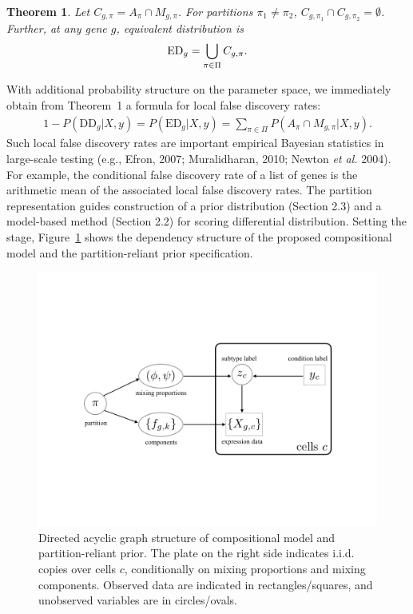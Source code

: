 \documentclass[aoas,preprint]{imsart}
\newtheorem{theorem}{Theorem}
\begin{document}
\begin{theorem}  Let $C_{g,\pi} = A_\pi\cap M_{g, \pi}$.  For 
partitions $\pi_1 \neq\pi_2$, \mbox{$C_{g,\pi_1} \cap C_{g,\pi_2} = \emptyset$}. Further,
 at any gene $g$, equivalent distribution is
\begin{eqnarray*}
{\rm{ED}}_g = \bigcup_{\pi \in \Pi} C_{g,\pi}.
\end{eqnarray*}
\end{theorem}
With additional 
probability structure on the parameter space,  we immediately obtain from Theorem~1 
a formula for local false discovery rates:
\begin{align}
\label{eq:lfdr}
1-P(\text{DD}_g|X,y) = 
 P(\text{ED}_g|X,y) = \sum_{\pi \in \Pi} P\left(A_\pi \cap M_{g,\pi} |X,y \right).
\end{align}
Such local false discovery rates are important empirical Bayesian 
statistics in large-scale testing (e.g., Efron, 2007; Muralidharan, 2010; Newton 
{\em et al.} 2004).  For example, the conditional false discovery rate of a list of genes 
is the arithmetic mean of the associated local false discovery rates.  
The partition representation guides construction of a prior distribution (Section 2.3) and a 
model-based method (Section 2.2) for scoring  differential distribution.   Setting the stage, 
Figure~\ref{fig:dag} shows the dependency structure of 
the proposed compositional model and the partition-reliant prior specification.

\begin{figure}[h!]
\includegraphics[trim={4cm 6cm 4cm 6cm}, clip, width=5in]{Figs/dag.png}
  \caption{Directed acyclic graph structure of compositional 
model and partition-reliant prior. The plate on the right side indicates i.i.d.
copies over cells $c$, conditionally on mixing proportions and mixing components.
 Observed data are indicated in rectangles/squares, and unobserved variables
are in circles/ovals. }
  \label{fig:dag}
\end{figure}
\end{document}
